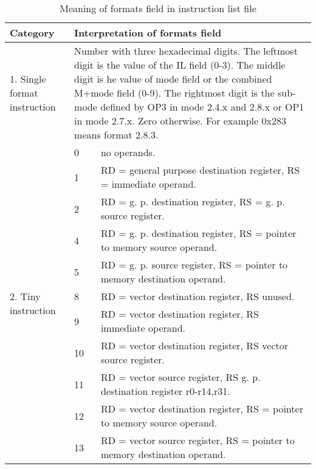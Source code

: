 \documentclass[forwardcom.tex]{subfiles}
\begin{document}
\pagebreak %
\label{table_format_field_in_list}
\begin{longtable} {|p{18mm}|p{14mm} p{80mm}|}
\caption{Meaning of formats field in instruction list file} 
\label{table:MeaningOfFormatsFieldInInstructionListFile}
\\
\endfirsthead
\endhead
\hline
\bfseries Category & \multicolumn{2}{|l|}{\bfseries Interpretation of formats field} \\
\hline
1.  Single format instruction & \multicolumn{2}{|p{102mm}|}{
Number with three hexadecimal digits. \newline
The leftmost digit is the value of the IL field (0-3). \newline
The middle digit is he value of mode field or the combined M+mode field (0-9).\newline
The rightmost digit is the sub-mode defined by OP3 in mode 2.4.x and 2.8.x or OP1 in mode 2.7.x. Zero otherwise. \newline
For example 0x283 means format 2.8.3.
}  \\
\hline
\multirow{11}{*}{\parbox{18mm}{2. Tiny instruction}} 
  &  0 & no operands. \\
  &  1 & RD = general purpose destination register, RS = immediate operand. \\
  &  2 & RD = g. p. destination register, RS = g. p. source register. \\
  &  4 & RD = g. p. destination register, RS = pointer to memory source operand. \\
  &  5 & RD = g. p. source register, RS = pointer to memory destination operand. \\
  &  8 & RD = vector destination register, RS unused. \\
  &  9 & RD = vector destination register, RS immediate operand. \\
  & 10 & RD = vector destination register, RS vector source register. \\
  & 11 & RD = vector source register, RS g. p. destination register r0-r14,r31. \\
  & 12 & RD = vector destination register, RS = pointer to memory source operand. \\
  & 13 & RD = vector source register, RS = pointer to memory destination operand. \\
\hline

\end{longtable}
\end{document}
